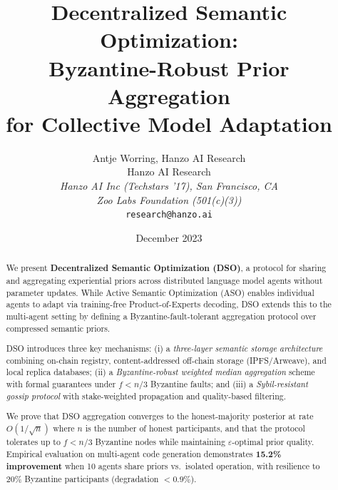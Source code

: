\documentclass[11pt]{article}
\title{Decentralized Semantic Optimization:\\Byzantine-Robust Prior Aggregation\\for Collective Model Adaptation}
\author{
    Antje Worring, Hanzo AI Research \\
    Hanzo AI Research\\
    \textit{Hanzo AI Inc (Techstars '17), San Francisco, CA}\\
    \textit{Zoo Labs Foundation (501(c)(3))}\\
    \texttt{research@hanzo.ai}
}
\date{December 2023}
\begin{document}
\hanzocoverpage

\begin{abstract}
We present \textbf{Decentralized Semantic Optimization (DSO)}, a protocol for
sharing and aggregating experiential priors across distributed language model
agents without parameter updates. While Active Semantic Optimization (ASO)
enables individual agents to adapt via training-free Product-of-Experts
decoding, DSO extends this to the multi-agent setting by defining a
Byzantine-fault-tolerant aggregation protocol over compressed semantic priors.

DSO introduces three key mechanisms: (i) a \emph{three-layer semantic storage
architecture} combining on-chain registry, content-addressed off-chain storage
(IPFS/Arweave), and local replica databases; (ii) a \emph{Byzantine-robust
weighted median aggregation} scheme with formal guarantees under $f < n/3$
Byzantine faults; and (iii) a \emph{Sybil-resistant gossip protocol} with
stake-weighted propagation and quality-based filtering.

We prove that DSO aggregation converges to the honest-majority posterior at rate
$O(1/\sqrt{n})$ where $n$ is the number of honest participants, and that the
protocol tolerates up to $f < n/3$ Byzantine nodes while maintaining
$\varepsilon$-optimal prior quality. Empirical evaluation on multi-agent code
generation demonstrates \textbf{15.2\% improvement} when 10 agents share priors
vs.\ isolated operation, with resilience to 20\% Byzantine participants
(degradation $< 0.9\%$).
\end{abstract}


















\end{document}
